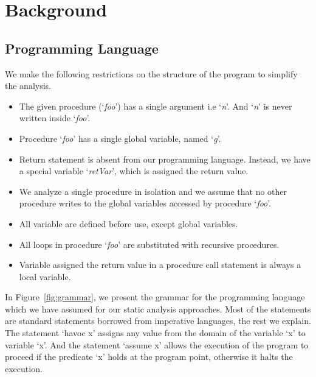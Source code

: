 \documentclass{llncs}
\newcommand{\foo}{\textit{foo}}
\newcommand{\retVar}{\textit{retVar}}
\newcommand{\n}{\textit{n}}
\newcommand{\g}{\textit{g}}
\begin{document}
\section{Background} \label{sec:background}

\subsection{Programming Language}
We make the following restrictions on the structure of the program to
simplify the analysis.

\begin{itemize}
\item The given procedure (`\foo') has a single argument i.e `\n'. And
  `\n' is never written inside `\foo'.
\item Procedure `\foo' has a single global variable, named `\g'.
\item Return statement is absent from our programming language. Instead,
  we have a special variable `\retVar', which is assigned the return
  value.
\item We analyze a single procedure in isolation and we assume that no
  other procedure writes to the global variables accessed by procedure
  `\foo'.
\item All variable are defined before use, except global variables.
\item All loops in procedure `\foo' are substituted with 
  recursive procedures.
\item Variable assigned the return value in a procedure call
  statement is always a local variable.
\end{itemize}

In Figure~\ref{fig:grammar}, we present the grammar for the programming
language which we have assumed for our static analysis approaches.
Most of the statements are standard statements borrowed from
imperative languages, the rest we explain. The statement `havoc x'
assigns any value from the domain of the variable `x' to variable `x'.
And the statement `assume x' allows the execution of the program to
proceed if the predicate `x' holds at the program point, otherwise it
halts the execution.
\end{document}

